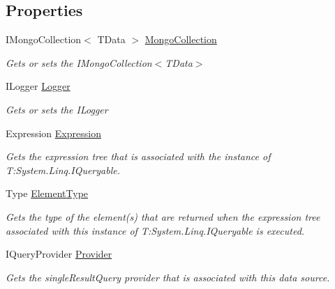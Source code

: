 \subsection*{Properties}
\begin{DoxyCompactItemize}
\item 
I\+Mongo\+Collection$<$ T\+Data $>$ \hyperlink{classCqrs_1_1MongoDB_1_1DataStores_1_1MongoDbDataStore_a116162a1c8e20706e99e850b0a9718cc_a116162a1c8e20706e99e850b0a9718cc}{Mongo\+Collection}
\begin{DoxyCompactList}\small\item\em Gets or sets the I\+Mongo\+Collection$<$\+T\+Data$>$ \end{DoxyCompactList}\item 
I\+Logger \hyperlink{classCqrs_1_1MongoDB_1_1DataStores_1_1MongoDbDataStore_a1258497689d7f866b2bc219cd8268b7d_a1258497689d7f866b2bc219cd8268b7d}{Logger}
\begin{DoxyCompactList}\small\item\em Gets or sets the I\+Logger \end{DoxyCompactList}\item 
Expression \hyperlink{classCqrs_1_1MongoDB_1_1DataStores_1_1MongoDbDataStore_ade387c1d511dfad22ff7eb752fb842e5_ade387c1d511dfad22ff7eb752fb842e5}{Expression}
\begin{DoxyCompactList}\small\item\em Gets the expression tree that is associated with the instance of T\+:\+System.\+Linq.\+I\+Queryable. \end{DoxyCompactList}\item 
Type \hyperlink{classCqrs_1_1MongoDB_1_1DataStores_1_1MongoDbDataStore_a54f5798a67d64a47e6acb15f378fb246_a54f5798a67d64a47e6acb15f378fb246}{Element\+Type}
\begin{DoxyCompactList}\small\item\em Gets the type of the element(s) that are returned when the expression tree associated with this instance of T\+:\+System.\+Linq.\+I\+Queryable is executed. \end{DoxyCompactList}\item 
I\+Query\+Provider \hyperlink{classCqrs_1_1MongoDB_1_1DataStores_1_1MongoDbDataStore_ab08ce716944d76cbaef9a94fd1525440_ab08ce716944d76cbaef9a94fd1525440}{Provider}
\begin{DoxyCompactList}\small\item\em Gets the single\+Result\+Query provider that is associated with this data source. \end{DoxyCompactList}\end{DoxyCompactItemize}


